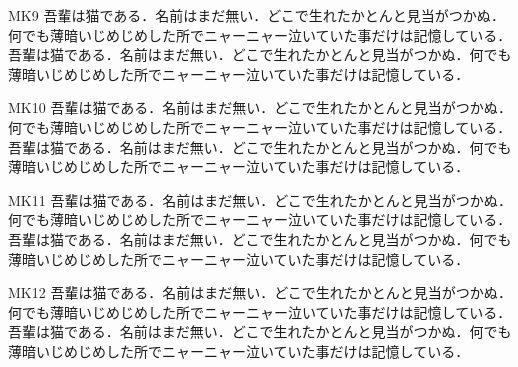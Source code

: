 \documentclass[fontsize=10pt,twocolumn]{jlreq}
\begin{document}
MK9 吾輩は猫である．名前はまだ無い．どこで生れたかとんと見当がつかぬ．何でも薄暗いじめじめした所でニャーニャー泣いていた事だけは記憶している． 吾輩は猫である．名前はまだ無い．どこで生れたかとんと見当がつかぬ．何でも薄暗いじめじめした所でニャーニャー泣いていた事だけは記憶している．\par
{}MK10 吾輩は猫である．名前はまだ無い．どこで生れたかとんと見当がつかぬ．何でも薄暗いじめじめした所でニャーニャー泣いていた事だけは記憶している． 吾輩は猫である．名前はまだ無い．どこで生れたかとんと見当がつかぬ．何でも薄暗いじめじめした所でニャーニャー泣いていた事だけは記憶している．\par
{}MK11 吾輩は猫である．名前はまだ無い．どこで生れたかとんと見当がつかぬ．何でも薄暗いじめじめした所でニャーニャー泣いていた事だけは記憶している． 吾輩は猫である．名前はまだ無い．どこで生れたかとんと見当がつかぬ．何でも薄暗いじめじめした所でニャーニャー泣いていた事だけは記憶している．\par
{}MK12 吾輩は猫である．名前はまだ無い．どこで生れたかとんと見当がつかぬ．何でも薄暗いじめじめした所でニャーニャー泣いていた事だけは記憶している． 吾輩は猫である．名前はまだ無い．どこで生れたかとんと見当がつかぬ．何でも薄暗いじめじめした所でニャーニャー泣いていた事だけは記憶している．\par
\end{document}
